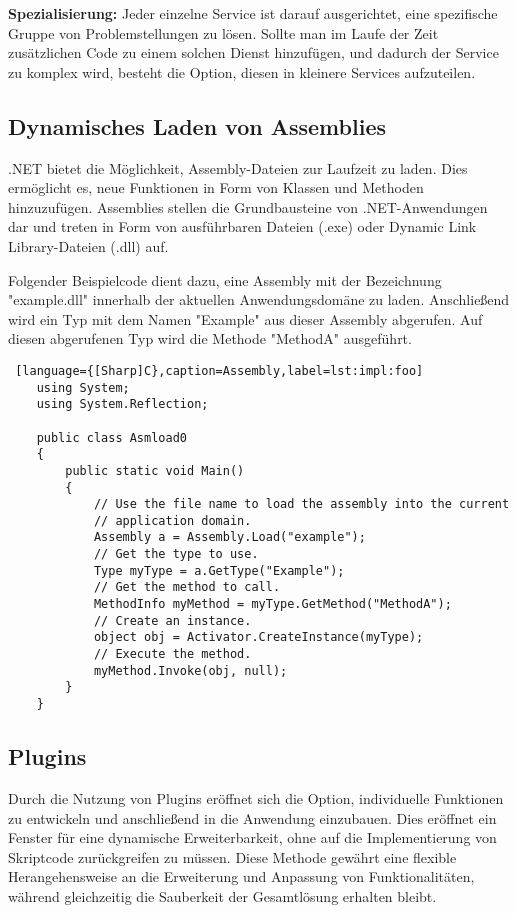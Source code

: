 \textbf{Spezialisierung:}
Jeder einzelne Service ist darauf ausgerichtet, eine spezifische Gruppe von 
Problemstellungen zu lösen. Sollte man im Laufe der Zeit zusätzlichen Code zu einem 
solchen Dienst hinzufügen, und dadurch der Service zu komplex wird, besteht die Option, 
diesen in kleinere Services aufzuteilen.

\newpage
\subsection*{Dynamisches Laden von Assemblies}

.NET bietet die Möglichkeit, Assembly-Dateien zur Laufzeit zu laden. 
Dies ermöglicht es, neue Funktionen in Form von Klassen und Methoden hinzuzufügen. 
Assemblies stellen die Grundbausteine von .NET-Anwendungen dar und treten in Form 
von ausführbaren Dateien (.exe) oder Dynamic Link Library-Dateien (.dll) auf.

Folgender Beispielcode dient dazu, eine Assembly mit der Bezeichnung "example.dll" innerhalb 
der aktuellen Anwendungsdomäne zu laden. Anschließend wird ein Typ mit dem Namen "Example" 
aus dieser Assembly abgerufen. Auf diesen abgerufenen Typ wird die Methode "MethodA" ausgeführt.

\begin{lstlisting} [language={[Sharp]C},caption=Assembly,label=lst:impl:foo]
    using System;
    using System.Reflection;
    
    public class Asmload0
    {
        public static void Main()
        {
            // Use the file name to load the assembly into the current
            // application domain.
            Assembly a = Assembly.Load("example");
            // Get the type to use.
            Type myType = a.GetType("Example");
            // Get the method to call.
            MethodInfo myMethod = myType.GetMethod("MethodA");
            // Create an instance.
            object obj = Activator.CreateInstance(myType);
            // Execute the method.
            myMethod.Invoke(obj, null);
        }
    }
\end{lstlisting}

\newpage
\subsection*{Plugins}

Durch die Nutzung von Plugins eröffnet sich die Option, individuelle Funktionen 
zu entwickeln und anschließend in die Anwendung einzubauen. 
Dies eröffnet ein Fenster für eine dynamische Erweiterbarkeit, ohne auf die Implementierung 
von Skriptcode zurückgreifen zu müssen. Diese Methode gewährt eine flexible 
Herangehensweise an die Erweiterung und Anpassung von Funktionalitäten, während 
gleichzeitig die Sauberkeit der Gesamtlösung erhalten bleibt.


